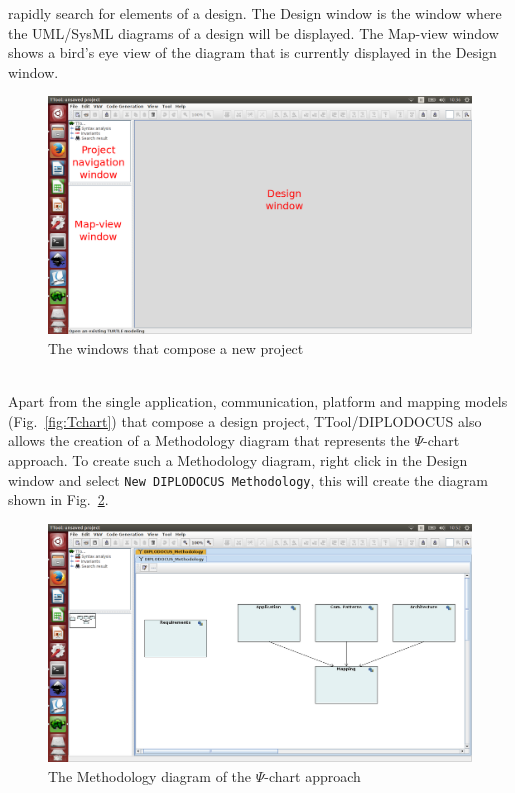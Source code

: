 \documentclass{llncs}
\newcommand{\screenshotsize}{1.0\textwidth}
\begin{document}
rapidly search for elements of a design. The Design window is the window where the UML/SysML diagrams of a design
will be displayed. The Map-view window shows a bird's eye view of the diagram that is currently displayed in the Design
window.
%
\begin{figure}[htbp]
	\centering
	\includegraphics[width=\screenshotsize]{./figures/screenshot/NewPrj.png}
	\caption{The windows that compose a new project}
	\label{fig:NewPrj}
\end{figure}
%
\\Apart from the single application, communication, platform and mapping models (Fig.~\ref{fig:Tchart}) that compose a
design project, TTool/DIPLODOCUS also allows the creation of a Methodology diagram that represents the $\Psi$-chart
approach. To create such a Methodology diagram, right click in the Design window and select \texttt{New DIPLODOCUS
Methodology}, this will create the diagram shown in Fig.~\ref{fig:MethDiag}.
%
\begin{figure}[htbp]
	\centering
	\includegraphics[width=\screenshotsize]{./figures/screenshot/MethDiag.png}
	\caption{The Methodology diagram of the $\Psi$-chart approach}
	\label{fig:MethDiag}
\end{figure}
\end{document}
